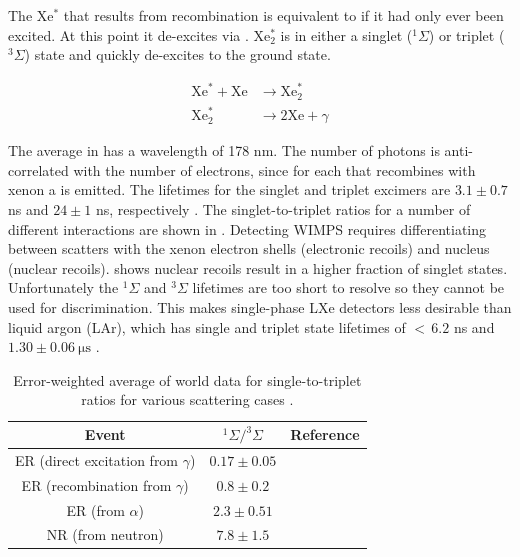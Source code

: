 \vspace{-10}

The Xe$^{*}$ that results from recombination is equivalent to if it had only ever been excited.  At this point
it de-excites via .  Xe$_{2}^{*}$ is in either a singlet
($^{1}\Sigma$) or triplet ($^{3}\Sigma$) state and quickly de-excites to the ground state.

\vspace{-10}

\begin{subequations}
\begin{align}
\mathrm{Xe}^{*} + \mathrm{Xe} &\rightarrow \mathrm{Xe}_{2}^{*} \\
\mathrm{Xe}_{2}^{*} &\rightarrow 2\mathrm{Xe} + \gamma \label{eq:deexcite_gamma}
\end{align}
\label{eq:deexcite}
\end{subequations}

\vspace{-10}

The average \gammaray in  has a wavelength of 178 nm.  The number of photons is
anti-correlated with the number of electrons, since for each \electron that
recombines with xenon a \gammaray is emitted.  The lifetimes for the singlet and triplet
excimers are $3.1 \pm 0.7$ ns and $24 \pm 1$ ns, respectively .  The singlet-to-triplet ratios for
a number of different interactions are shown in .  Detecting WIMPS requires differentiating between
scatters with the xenon electron shells (electronic recoils) and nucleus (nuclear recoils).   shows
nuclear recoils result in a higher fraction of singlet states.  Unfortunately the $^1\Sigma$ and $^3\Sigma$ lifetimes
are too short to resolve so they cannot be used for discrimination.  This makes single-phase LXe detectors
less desirable than liquid argon (LAr), which has single and triplet state lifetimes of ${<}\, 6.2$ ns and $1.30 \pm 0.06\ \mathrm{\mu s}$
.

\begin{table}[t]
 \centering
 \begin{tabular}{ccc}
 \hline
 \hline
 Event & $^1\Sigma / ^3\Sigma$ & Reference \\
 \hline
 ER (direct excitation from $\gamma$) & $0.17 \pm 0.05$ & \\
 ER (recombination from $\gamma$) & $0.8 \pm 0.2$ & \\
 ER (from $\alpha$) & $2.3 \pm 0.51$ & \\
 NR (from neutron) & $7.8 \pm 1.5$ & \\
 \hline
 \hline
 \end{tabular}
 \caption{Error-weighted average of world data for single-to-triplet ratios for various scattering cases .}
\label{tab:singlet_to_triplet}
\end{table}

